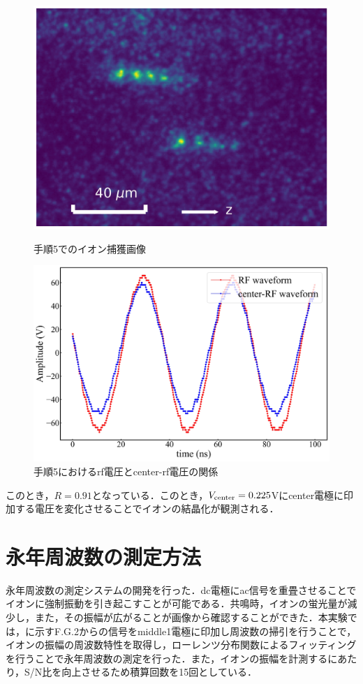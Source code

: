 \begin{enumerate}
\begin{figure}[h]
	\begin{minipage}{0.48\linewidth}
	\begin{center}
		\includegraphics[width = 0.6\columnwidth]{./methods/figure/5_2D.jpg}
		\caption{手順5でのイオン捕獲画像}
		\label{fig:5_2D}
	\end{center}
	\end{minipage}
	\begin{minipage}{0.48\linewidth}
		\begin{center}
			\includegraphics[width = 0.9\columnwidth]{./methods/figure/5_2D_wave.jpg}
			\caption{手順5におけるrf電圧とcenter-rf電圧の関係}
			\label{fig:5_2D_wave}
		\end{center}
	\end{minipage}
\end{figure}

このとき，$R=0.91$となっている．このとき，$V_{\rm center} = 0.225$Vにcenter電極に印加する電圧を変化させることでイオンの結晶化が観測される．

\end{enumerate}

\clearpage

\section{永年周波数の測定方法} \label{MaesSecFreq_Mathod}
永年周波数の測定システムの開発を行った．dc電極にac信号を重畳させることでイオンに強制振動を引き起こすことが可能である．共鳴時，イオンの蛍光量が減少し，また，その振幅が広がることが画像から確認することができた．本実験では，に示すF.G.2からの信号をmiddle1電極に印加し周波数の掃引を行うことで，イオンの振幅の周波数特性を取得し，ローレンツ分布関数によるフィッティングを行うことで永年周波数の測定を行った．また，イオンの振幅を計測するにあたり，S/N比を向上させるため積算回数を15回としている．

